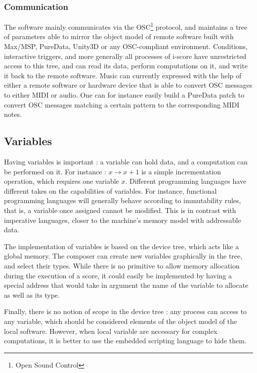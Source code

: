 \documentclass{article}
\begin{document}
\subsubsection{Communication}
The software mainly communicates via the OSC\footnote{Open Sound Control} protocol,  and maintains a tree of parameters able to mirror 
the object model of remote software built with Max/MSP, PureData, Unity3D or any OSC-compliant environment. 
Conditions, interactive triggers, and more generally all processes of i-score have unrestricted 
access to this tree, and can read its data, perform computations on it, and write it back to the 
remote software.
Music can currently expressed with the help of either a remote software or hardware device that is able 
to convert OSC messages to either MIDI or audio.
One can for instance easily build a PureData patch to convert OSC messages matching a certain pattern 
to the corresponding MIDI notes.

\subsection{Variables}
Having variables is important : a variable can hold data, 
and a computation can be performed on it.
For instance : $x \rightarrow x + 1$ is a simple incrementation 
operation, which requires one variable $x$.
Different programming languages have different takes on the 
capabilities of variables.
For instance, functional programming languages will generally 
behave according to immutability rules, that is, a variable once 
assigned cannot be modified.
This is in contrast with imperative languages, closer 
to the machine's memory model with addressable data.

The implementation of variables is based on the device tree, which 
acts like a global memory. 
The composer can create new variables graphically in the tree, and select their types.
While there is no primitive to allow memory allocation during the execution of a score, it could easily be implemented by having a special address that would take in argument the name of the variable to allocate as well as its type.

Finally, there is no notion of scope in the device tree : any process can access to any variable, which 
should be considered elements of the object model of the local software.
However, when local variable are necessary for complex computations, it 
is better to use the embedded scripting language to hide them.
\end{document}
